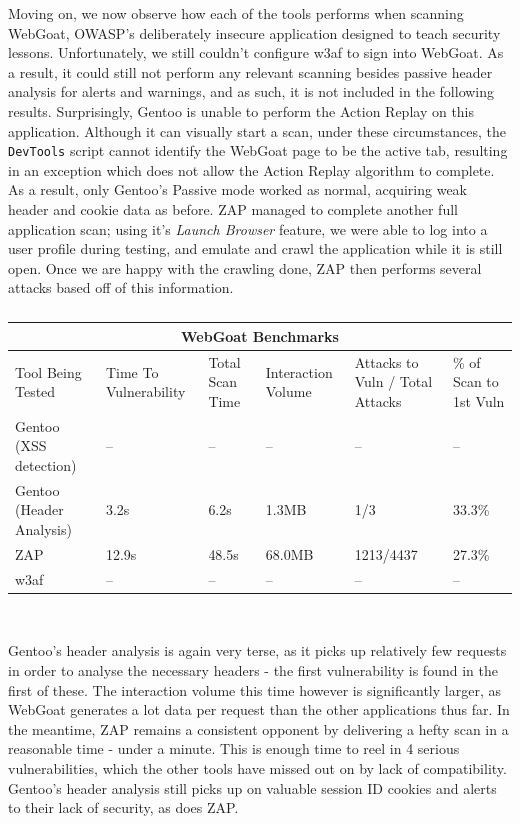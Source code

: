 Moving on, we now observe how each of the tools performs when scanning WebGoat, OWASP's deliberately insecure application designed to teach security lessons. Unfortunately, we still couldn't configure w3af to sign into WebGoat. As a result, it could still not perform any relevant scanning besides passive header analysis for alerts and warnings, and as such, it is not included in the following results. Surprisingly, Gentoo is unable to perform the Action Replay on this application. Although it can visually start a scan, under these circumstances, the \texttt{DevTools} script cannot identify the WebGoat page to be the active tab, resulting in an exception which does not allow the Action Replay algorithm to complete. As a result, only Gentoo's Passive mode worked as normal, acquiring weak header and cookie data as before. ZAP managed to complete another full application scan; using it's \textit{Launch Browser} feature, we were able to log into a user profile during testing, and emulate and crawl the application while it is still open. Once we are happy with the crawling done, ZAP then performs several attacks based off of this information. \\

\begin{table}[h]
	
	{
		\captionsetup{justification=centering}		
		\caption{}
		\label{table:webgoat_benchmarks}
		\begin{tabular}{ |p{4cm}||p{1.4cm}|p{1.4cm}|p{1.6cm}|p{2cm}|p{2cm}| }
			\hline
			\multicolumn{6}{|c|}{\textbf{WebGoat Benchmarks}} \\ [0.5ex]
			\hline \hline 
			Tool Being Tested& Time To Vulnerability & Total Scan Time & Interaction Volume & Attacks to Vuln / Total Attacks & \% of Scan to 1st Vuln \\
			\hline
			Gentoo (XSS detection)    & --     & --    &   --          & -- & -- \\
			Gentoo (Header Analysis) &  3.2s   & 6.2s   & 1.3MB   & 1/3 & 33.3\%\\
			ZAP                                   & 12.9s &  48.5s   & 68.0MB  & 1213/4437 & 27.3\%\\ 
			w3af                                 & -- & -- & -- & -- & -- \\
			\hline
		\end{tabular}
	} \\
\end{table}


Gentoo's header analysis is again very terse, as it picks up relatively few requests in order to analyse the necessary headers - the first vulnerability is found in the first of these. The interaction volume this time however is significantly larger, as WebGoat generates a lot data per request than the other applications thus far. In the meantime, ZAP remains a consistent opponent by delivering a hefty scan in a reasonable time - under a minute. This is enough time to reel in 4 serious vulnerabilities, which the other tools have missed out on by lack of compatibility. Gentoo's header analysis still picks up on valuable session ID cookies and alerts to their lack of security, as does ZAP. 

